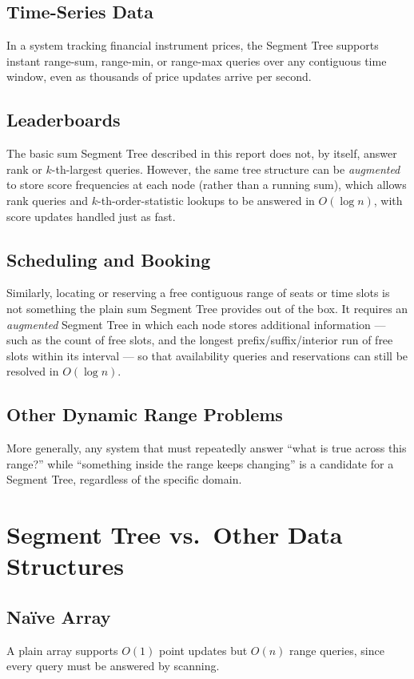 \documentclass[11pt]{scrartcl}
\begin{document}
\subsection{Time-Series Data}
In a system tracking financial instrument prices, the Segment Tree supports instant range-sum, range-min, or range-max queries over any contiguous time window, even as thousands of price updates arrive per second.

\subsection{Leaderboards}
The basic sum Segment Tree described in this report does not, by itself, answer rank or $k$-th-largest queries. However, the same tree structure can be \emph{augmented} to store score frequencies at each node (rather than a running sum), which allows rank queries and $k$-th-order-statistic lookups to be answered in $O(\log n)$, with score updates handled just as fast.

\subsection{Scheduling and Booking}
Similarly, locating or reserving a free contiguous range of seats or time slots is not something the plain sum Segment Tree provides out of the box. It requires an \emph{augmented} Segment Tree in which each node stores additional information --- such as the count of free slots, and the longest prefix/suffix/interior run of free slots within its interval --- so that availability queries and reservations can still be resolved in $O(\log n)$.

\subsection{Other Dynamic Range Problems}
More generally, any system that must repeatedly answer ``what is true across this range?'' while ``something inside the range keeps changing'' is a candidate for a Segment Tree, regardless of the specific domain.

\section{Segment Tree vs.\ Other Data Structures}

\subsection{Na\"ive Array}
A plain array supports $O(1)$ point updates but $O(n)$ range queries, since every query must be answered by scanning.
\end{document}
